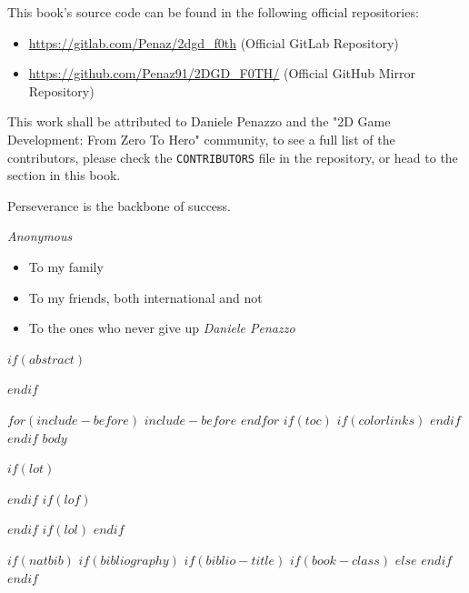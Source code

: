 \documentclass{article}
\begin{document}
This book's source code can be found in the following official repositories:

\begin{itemize}
    \item \url{https://gitlab.com/Penaz/2dgd_f0th} (Official GitLab Repository)
    \item \url{https://github.com/Penaz91/2DGD_F0TH/} (Official GitHub Mirror Repository)
\end{itemize}

\vspace{24pt}

This work shall be attributed to Daniele Penazzo and the "2D Game Development: From Zero To Hero" community, to see a full list of the contributors, please check the \texttt{CONTRIBUTORS} file in the repository, or head to the  section in this book.

\clearpage

\clearpage
\null
\vfill
\begin{minipage}[b]{\textwidth}
\epigraph{Perseverance is the backbone of success.}{\textit{Anonymous}}
\addvspace{200 pt}
\begin{itemize}[label={}]
    \item To my family
    \item To my friends, both international and not
    \item To the ones who never give up
    \textit{Daniele Penazzo}
\end{itemize}
\end{minipage}
\vfill
\cleardoublepage
\pagestyle{fancy}
\normalsize
$if(abstract)$
\begin{abstract}
$abstract$
\end{abstract}
$endif$

$for(include-before)$
$include-before$
$endfor$
$if(toc)$
{
$if(colorlinks)$
\hypersetup{linkcolor=$if(toccolor)$$toccolor$$else$black$endif$}
$endif$
\clearpage
\pagestyle{empty}
\null\clearpage
\pagestyle{fancy}
\tableofcontents
\clearpage
}
$endif$
\clearpage
{}
$body$

\clearpage
{}
$if(lot)$
\listoftables
$endif$
$if(lof)$
\listoffigures
$endif$
$if(lol)$
\lstlistoflistings
$endif$

$if(natbib)$
$if(bibliography)$
$if(biblio-title)$
$if(book-class)$
\renewcommand\bibname{$biblio-title$}
$else$
\renewcommand\refname{$biblio-title$}
$endif$
$endif$

\end{document}
